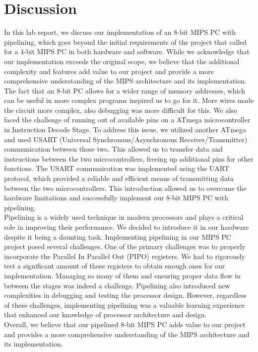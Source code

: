 \documentclass[12pt]{article}
\begin{document}
\newpage
\section{\large{Discussion}}
In this lab report, we discuss our implementation of an 8-bit MIPS PC with pipelining, which goes beyond the initial requirements of the project that called for a 4-bit MIPS PC in both hardware and software. While we acknowledge that our implementation exceeds the original scope, we believe that the additional complexity and features add value to our project and provide a more comprehensive understanding of the MIPS architecture and its implementation.\\

The fact that an 8-bit PC allows for a wider range of memory addresses, which can be useful in more complex programs inspired us to go for it. More wires made the circuit more complex, also debugging was more difficult for this. We also faced the challenge of running out of available pins on a ATmega microcontroller in Instruction Decode Stage. To address this issue, we utilized another ATmega and used USART (Universal Synchronous/Asynchronous Receiver/Transmitter) communication between these two. This allowed us to transfer data and instructions between the two microcontrollers, freeing up additional pins for other functions. The USART communication was implemented using the UART protocol, which provided a reliable and efficient means of transmitting data between the two microcontrollers. This introduction allowed us to overcome the hardware limitations and successfully implement our 8-bit MIPS PC with pipelining. \\

Pipelining is a widely used technique in modern processors and plays a critical role in improving their performance. We decided to introduce it in our hardware despite it being a daunting task. Implementing pipelining in our MIPS PC project posed several challenges. One of the primary challenges was to properly incorporate the Parallel In Parallel Out (PIPO) registers. We had to rigorously test a significant amount of these registers to obtain enough ones for our implementation. Managing so many of them and ensuring proper data flow in between the stages was indeed a challenge. Pipelining also introduced new complexities in debugging and testing the processor design. However, regardless of these challenges, implementing pipelining was a valuable learning experience that enhanced our knowledge of processor architecture and design.\\


Overall, we believe that our pipelined 8-bit MIPS PC adds value to our project and provides a more comprehensive understanding of the MIPS architecture and its implementation.
\end{document}
